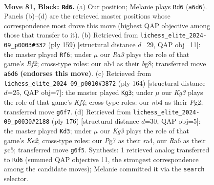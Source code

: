 \documentclass[11pt]{article}
\begin{document}
\clearpage

\begin{figure}[p]\centering
\begin{subfigure}{0.46\textwidth}\centering
\resizebox{\linewidth}{!}{%
\newchessgame
\chessboard[
  setfen={1R6/6p1/r4pk1/3P3p/1N5P/6P1/5K2/8 b - - 2 81},
  showmover=false,
  pgfstyle=straightmove, color=movearrow, markmove={a6-d6}
]}
\caption{}
\end{subfigure}\hfill
\begin{subfigure}{0.46\textwidth}\centering
\resizebox{\linewidth}{!}{%
\newchessgame
\chessboard[
  setfen={6B1/5r2/8/R4pp1/4pk2/7P/5PK1/8 b - - 45 80},
  showmover=false,
  pgfstyle=straightmove, color=movearrow, markmove={f7-f6}
]}
\caption{}
\end{subfigure}
\\[4pt]
\begin{subfigure}{0.46\textwidth}\centering
\resizebox{\linewidth}{!}{%
\newchessgame
\chessboard[
  setfen={8/5pk1/6p1/7p/4PK1P/5P2/1R4P1/7r w - - 51 83},
  showmover=false,
  pgfstyle=straightmove, color=movearrow, markmove={f4-g3}
]}
\caption{}
\end{subfigure}\hfill
\begin{subfigure}{0.46\textwidth}\centering
\resizebox{\linewidth}{!}{%
\newchessgame
\chessboard[
  setfen={8/P1R5/3p4/2pk4/r4p2/5P2/4KP2/8 w - - 1 89},
  showmover=false,
  pgfstyle=straightmove, color=movearrow, markmove={e2-d3}
]}
\caption{}
\end{subfigure}
\caption{\textbf{Move 81, Black: \texttt{Rd6}.} (a) Our position; Melanie plays \texttt{Rd6} (\texttt{a6d6}). Panels (b)--(d) are the retrieved master positions whose correspondence most drove this move (highest QAP objective among those that transfer to it). (b) Retrieved from \texttt{lichess\_elite\_2024-09\_p0003\#332} (ply 159) [structural distance $d$=29, QAP obj=11]: the master played \texttt{Rf6}; under $\mu$ our \emph{Ra3} plays the role of that game's \emph{Rf2}; cross-type roles: our \emph{n}b4 as their \emph{b}g8; transferred move \texttt{a6d6} \textbf{(endorses this move)}. (c) Retrieved from \texttt{lichess\_elite\_2024-09\_p0010\#3872} (ply 164) [structural distance $d$=25, QAP obj=7]: the master played \texttt{Kg3}; under $\mu$ our \emph{Kg3} plays the role of that game's \emph{Kf4}; cross-type roles: our \emph{n}b4 as their \emph{P}g2; transferred move \texttt{g6f7}. (d) Retrieved from \texttt{lichess\_elite\_2024-09\_p0030\#2188} (ply 176) [structural distance $d$=30, QAP obj=5]: the master played \texttt{Kd3}; under $\mu$ our \emph{Kg3} plays the role of that game's \emph{Ke2}; cross-type roles: our \emph{P}g7 as their \emph{r}a4, our \emph{R}a6 as their \emph{p}c5; transferred move \texttt{g6f5}. Synthesis: 1 retrieved analog transferred to \texttt{Rd6} (summed QAP objective 11, the strongest correspondence among the candidate moves); Melanie committed it via the \texttt{search} selector.}
\label{fig:thought-m161}
\end{figure}
\end{document}
